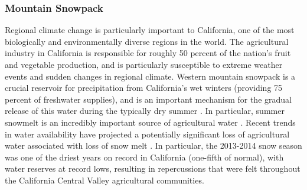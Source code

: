 \documentclass[11pt]{article}
\begin{document}
\subsubsection{Mountain Snowpack}

Regional climate change is particularly important to California, one of the most biologically and environmentally diverse regions in the world. The agricultural industry in California is responsible for roughly 50 percent of the nation’s fruit and vegetable production, and is particularly susceptible to extreme weather events and sudden changes in regional climate. Western mountain snowpack is a crucial reservoir for precipitation from California’s wet winters (providing 75 percent of freshwater supplies), and is an important mechanism for the gradual release of this water during the typically dry summer \citep{cayan1996interannual}. In particular, summer snowmelt is an incredibly important source of agricultural water \citep{dettinger1995large, mote_declining_2005, maurer2007detection}. Recent trends in water availability have projected a potentially significant loss of agricultural water associated with loss of snow melt \citep{dyer2006spatial}. In particular, the 2013-2014 snow season was one of the driest years on record in California (one-fifth of normal), with water reserves at record lows, resulting in repercussions that were felt throughout the California Central Valley agricultural communities.
\end{document}
